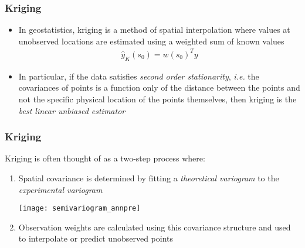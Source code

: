 \documentclass{beamer}
\begin{document}
\begin{frame}
	\frametitle{Kriging}
	\begin{itemize}
		\item In geostatistics, kriging is a method of spatial interpolation where values at unobserved locations are estimated using a weighted sum of known values
		\begin{align*}
			\hat{y}_{K}(s_0) = w(s_0)^T y
		\end{align*}
		\item In particular, if the data satisfies \textit{second order stationarity}, \textit{i.e.} the covariances of points is a function only of the distance between the points and not the specific physical location of the points themselves, then kriging is the \textit{best linear unbiased estimator}\cite{cressie93}
	\end{itemize}
\end{frame}

\begin{frame}
	\frametitle{Kriging}
	Kriging is often thought of as a two-step process where:
	\begin{enumerate}
		\item Spatial covariance is determined by fitting a \textit{theoretical variogram} to the \textit{experimental variogram}
			\begin{center}
			\texttt{[image: semivariogram\_annpre]}
		\end{center}
		\item Observation weights are calculated using this covariance structure and used to interpolate or predict unobserved points
	\end{enumerate}
\end{frame}

\end{document}
